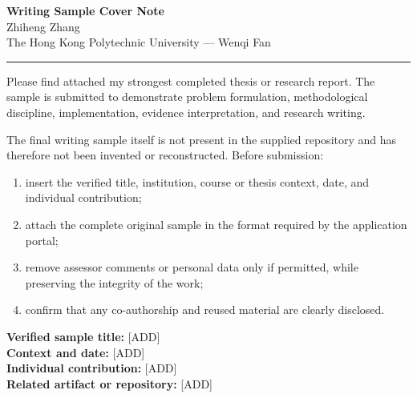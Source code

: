 \documentclass[11pt]{article}
\newcommand{\ApplicantName}{Zhiheng Zhang}
\begin{document}
\begin{center}
{\LARGE\bfseries Writing Sample Cover Note}\\[0.25em]
{\large \ApplicantName}\\
The Hong Kong Polytechnic University --- Wenqi Fan
\end{center}
\vspace{0.35em}\hrule\vspace{0.65em}

Please find attached my strongest completed thesis or research report. The sample is submitted to demonstrate problem formulation, methodological discipline, implementation, evidence interpretation, and research writing.

The final writing sample itself is not present in the supplied repository and has therefore not been invented or reconstructed. Before submission:
\begin{enumerate}
\item insert the verified title, institution, course or thesis context, date, and individual contribution;
\item attach the complete original sample in the format required by the application portal;
\item remove assessor comments or personal data only if permitted, while preserving the integrity of the work;
\item confirm that any co-authorship and reused material are clearly disclosed.
\end{enumerate}

\textbf{Verified sample title:} [ADD]\\
\textbf{Context and date:} [ADD]\\
\textbf{Individual contribution:} [ADD]\\
\textbf{Related artifact or repository:} [ADD]
\end{document}
